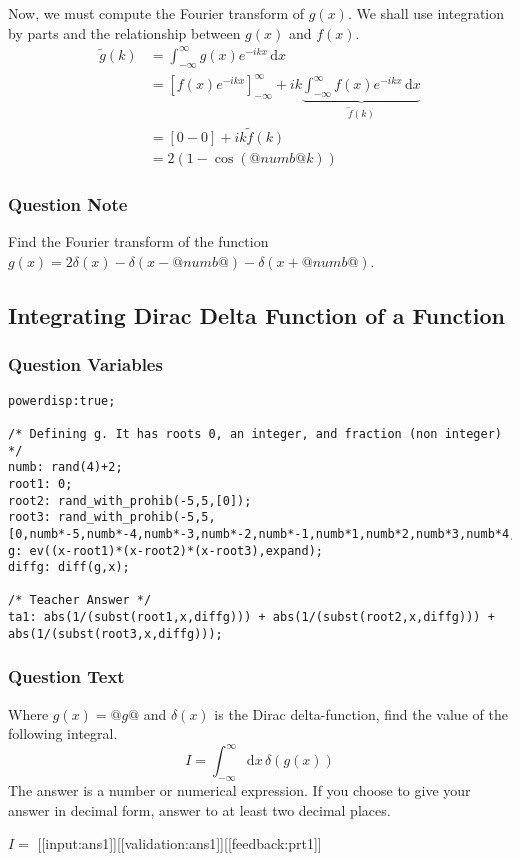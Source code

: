 \documentclass[a4paper,10pt]{article}
\begin{document}
Now, we must compute the Fourier transform of \(g(x)\). We shall use integration by parts and the relationship between \(g(x)\) and \(f(x)\). \begin{align*} \tilde{g}(k) &= \int_{-\infty}^{\infty} g(x)e^{-ikx} \, \text{d}x \\ &= \left[ f(x)e^{-ikx} \right]_{-\infty}^{\infty} + ik \underbrace{\int_{-\infty}^{\infty} f(x)e^{-ikx} \, \text{d}x}_{\tilde{f}(k)} \\ &= \left[0 - 0 \right] + ik\tilde{f}(k) \\ &= 2(1-\cos(@numb@k)) \end{align*}
\subsubsection{Question Note}
Find the Fourier transform of the function \(g(x) = 2\delta(x)-\delta(x-@numb@)-\delta(x+@numb@)\).

\subsection{Integrating Dirac Delta Function of a Function}
\subsubsection{Question Variables}
\begin{lstlisting}
powerdisp:true;

/* Defining g. It has roots 0, an integer, and fraction (non integer) */
numb: rand(4)+2;
root1: 0;
root2: rand_with_prohib(-5,5,[0]);
root3: rand_with_prohib(-5,5,[0,numb*-5,numb*-4,numb*-3,numb*-2,numb*-1,numb*1,numb*2,numb*3,numb*4,numb*5,root2*numb])/(numb);
g: ev((x-root1)*(x-root2)*(x-root3),expand);
diffg: diff(g,x);

/* Teacher Answer */
ta1: abs(1/(subst(root1,x,diffg))) + abs(1/(subst(root2,x,diffg))) + abs(1/(subst(root3,x,diffg)));
\end{lstlisting}
\subsubsection{Question Text}
Where \(g(x)=@g@\) and \(\delta(x)\) is the Dirac delta-function, find the value of the following integral. \[ I= \int_{-\infty}^{\infty} \text{d}x \, \delta(g(x)) \]The answer is a number or numerical expression. If you choose to give your answer in decimal form, answer to at least two decimal places.

\(I = \) [[input:ans1]][[validation:ans1]][[feedback:prt1]]
\end{document}
